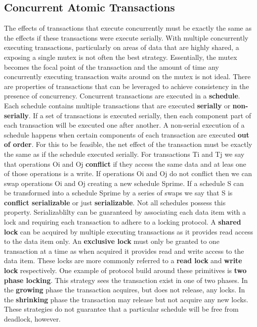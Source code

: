 \documentclass[10pt,a4paper]{article}
\begin{document}
\subsection{Concurrent Atomic Transactions}
The effects of transactions that execute concurrently must be exactly the same as the effects if these transactions were execute serially. With multiple concurrently executing transactions, particularly on areas of data that are highly shared, a exposing a single mutex is not often the best strategy. Essentially, the mutex becomes the focal point of the transaction and the amount of time any concurrently executing transaction waits around on the mutex is not ideal. There are properties of transactions that can be leveraged to achieve consistency in the presence of concurrency. 
\newline\newline
Concurrent transactions are executed in a {\bf schedule}. Each schedule contains multiple transactions that are executed {\bf serially} or {\bf non-serially}. If a set of transactions is executed serially, then each component part of each transaction will be executed one after another. A non-serial execution of a schedule happens when certain components of each transaction are executed {\bf out of order}. For this to be feasible, the net effect of the transaction must be exactly the same as if the schedule executed serially. For transactions Ti and Tj we say that operations Oi and Oj {\bf conflict} if they access the same data and at leas one of those operations is a write. If operations Oi and Oj do not conflict then we can swap operations Oi and Oj creating a new schedule Sprime. If a schedule S can be transformed into a schedule Sprime by a series of swaps we say that S is {\bf conflict serializable} or just {\bf serializable}. Not all schedules possess this property. 
\newline\newline
Serializablilty can be guaranteed by associating each data item with a lock and requiring each transaction to adhere to a locking protocol. A {\bf shared lock} can be acquired by multiple executing transactions as it provides read access to the data item only. An {\bf exclusive lock} must only be granted to one transaction at a time as when acquired it provides read and write access to the data item. These locks are more commonly referred to a {\bf read lock} and {\bf write lock} respectively. One example of protocol build around these primitives is {\bf two phase locking}. This strategy sees the transaction exist in one of two phases. In the {\bf growing} phase the transaction acquires, but does not release, any locks. In the {\bf shrinking} phase the transaction may release but not acquire any new locks. These strategies do not guarantee that a particular schedule will be free from deadlock, however. 
\end{document}
